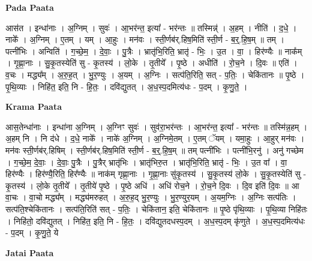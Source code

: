 \documentclass[17pt]{extarticle}
\begin{document}
\textbf{Pada Paata} \newline

आस॑त । इन्धा॑नाः । अ॒ग्निम् । सुवः॑ । आ॒भर॑न्त॒ इत्या᳚ - भर॑न्तः ॥ तस्मिन्न्॑ । अ॒हम् । नीति॑ । द॒धे॒ । नाके᳚ । अ॒ग्निम् । ए॒तम् । यम् । आ॒हुः । मन॑वः । स्ती॒र्णब॑र्.हिष॒मिति॑ स्ती॒र्ण - ब॒र्॒.हि॒ष॒म् ॥ तम् । पत्नी॑भिः । अन्विति॑ । ग॒च्छे॒म॒ । दे॒वाः॒ । पु॒त्रैः । भ्रातृ॑भि॒रिति॒ भ्रातृ॑ - भिः॒ । उ॒त । वा॒ । हिर॑ण्यैः ॥ नाक᳚म् । गृ॒ह्णा॒नाः । सु॒कृ॒तस्येति॑ सु - कृ॒तस्य॑ । लो॒के । तृ॒तीये᳚ । पृ॒ष्ठे । अधीति॑ । रो॒च॒ने । दि॒वः ॥ एति॑ । व॒चः । मद्ध्य᳚म् । अ॒रु॒ह॒त् । भु॒र॒ण्युः । अ॒यम् । अ॒ग्निः । सत्प॑ति॒रिति॒ सत् - प॒तिः॒ । चेकि॑तानः ॥ पृ॒ष्ठे । पृ॒थि॒व्याः । निहि॑त॒ इति॒ नि - हि॒तः॒ । दवि॑द्युतत् । अ॒ध॒स्प॒दमित्य॑धः - प॒दम् । कृ॒णु॒ते॒ ।  \newline


\textbf{Krama Paata} \newline

आस॒तेन्धा॑नाः । इन्धा॑ना अ॒ग्निम् । अ॒ग्निꣳ सुवः॑ । सुव॑रा॒भर॑न्तः । आ॒भर॑न्त॒ इत्या᳚ - भर॑न्तः ॥ तस्मि॑न्न॒हम् । अ॒हम् नि । नि द॑धे । द॒धे॒ नाके᳚ । नाके॑ अ॒ग्निम् । अ॒ग्निमे॒तम् । ए॒तम् ॅयम् । यमा॒हुः । आ॒हुर् मन॑वः । मन॑वः स्ती॒र्णब॑र्.हिषिम् । स्ती॒र्णब॑र्.हिष॒मिति॑ स्ती॒र्ण - ब॒र्॒.हि॒ष॒॒म् ॥ तम् पत्नी॑भिः । पत्नी॑भि॒रनु॑ । अनु॑ गच्छेम । ग॒च्छे॒म॒ दे॒वाः॒ । दे॒वाः॒ पु॒त्रैः । पु॒त्रैर् भ्रातृ॑भिः । भ्रातृ॑भिरु॒त । भ्रातृ॑भि॒रिति॒ भ्रातृ॑ - भिः॒ । उ॒त वा᳚ । वा॒ हिर॑ण्यैः । हिर॑ण्यै॒रिति॒ हिर᳚ण्यैः ॥ नाक॑म् गृह्णा॒नाः । गृ॒ह्णा॒नाः सु॑कृ॒तस्य॑ । सु॒कृ॒तस्य॑ लो॒के । सु॒कृ॒तस्येति॑ सु - कृ॒तस्य॑ । लो॒के तृ॒तीये᳚ । तृ॒तीये॑ पृ॒ष्ठे । पृ॒ष्ठे अधि॑ । अधि॑ रोच॒ने । रो॒च॒ने दि॒वः । दि॒व इति॑ दि॒वः ॥ आ वा॒चः । वा॒चो मद्ध्य᳚म् । मद्ध्य॑मरुहत् । अ॒रु॒ह॒द् भु॒र॒ण्युः । भु॒र॒ण्युर॒यम् । अ॒यम॒ग्निः । अ॒ग्निः सत्प॑तिः । सत्प॑ति॒श्चेकि॑तानः । सत्प॑ति॒रिति॑ सत् - प॒तिः॒ । चेकि॑तान॒ इति॒ चेकि॑तानः ॥ पृ॒ष्ठे पृ॑थि॒व्याः । पृ॒थि॒व्या निहि॑तः । निहि॑तो॒ दवि॑द्युतत् । निहि॑त॒ इति॒ नि - हि॒तः॒ । दवि॑द्युतदधस्प॒दम् । अ॒ध॒स्प॒दम् कृ॑णुते । अ॒ध॒स्प॒दमित्य॑धः - प॒दम् । कृ॒णु॒ते॒ ये \newline

\textbf{Jatai Paata} \newline
\end{document}
